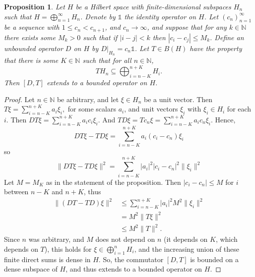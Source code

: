 \documentclass[12pt]{amsart}
\newcommand{\sse}{\subseteq}
\newcommand{\N}{\mathbb{N}}
\theoremstyle{plain} %
\newtheorem{Proposition}[Theorem]{Proposition}
\theoremstyle{definition} %
\begin{document}
\begin{Proposition}\label{prop the point of D}
    Let $H$ be a Hilbert space with finite-dimensional subspaces $H_n$ such that $H = \bigoplus_{n=1}^{\infty} H_n$. Denote by $\mathds{1}$ the identity operator on $H$.
    Let $(c_n)_{n=1}^{\infty}$ be a sequence with $1 \leq c_n < c_{n+1}$, and $c_n \to \infty$, and suppose that for any $k \in \N$ there exists some $M_k>0$ such that if $|i-j| < k$ then $|c_i - c_j| \leq M_k$. Define an unbounded operator $D$ on $H$ by $D|_{H_n} = c_n \mathds{1}$. Let $T \in B(H)$ have the property that there is some $K \in \N$ such that for all $n \in \N$, \[TH_n \sse \bigoplus_{i = n-K}^{n+K} H_i. \]
    Then $[D,T]$ extends to a bounded operator on $H$.
\end{Proposition}
\begin{proof}
    Let $n \in \N$ be arbitrary, and let $\xi \in H_n$ be a unit vector. Then $T\xi = \sum_{i=n-K}^{n+K} a_i \xi_i,$ for some scalars $a_i$, and unit vectors $\xi_i$ with $\xi_i \in H_i$ for each $i$. Then $DT \xi = \sum_{i=n-K}^{n+K} a_i c_i \xi_i.$ And $TD\xi = T c_n \xi = \sum_{i=n-K}^{n+K} a_i c_n \xi_i$. Hence,
    \[
    DT\xi - TD \xi = \sum_{i=n-K}^{n+K} a_i (c_i - c_n) \xi_i
    \]
    so
    \[
    \|DT\xi - TD \xi\|^2 = \sum_{i=n-K}^{n+K} |a_i|^2 |c_i - c_n|^2 \|\xi_i\|^2
    \]
    Let $M = M_K$ as in the statement of the proposition. Then $|c_i - c_n| \leq M$ for $i$ between $n-K$ and $n+K$, thus
    \begin{align*}
        \|(DT - TD) \xi\|^2 &\leq \sum_{i=n-K}^{n+K} |a_i|^2 M^2 \|\xi_i\|^2\\
        &= M^2 \|T \xi\|^2\\
        &\leq M^2 \|T\|^2.
    \end{align*}
    Since $n$ was arbitrary, and $M$ does not depend on $n$ (it depends on $K$, which depends on $T$), this holds for $\xi \in \bigoplus_{i=1}^n H_i$, and the increasing union of these finite direct sums is dense in $H$. So, the commutator $[D,T]$ is bounded on a dense subspace of $H$, and thus extends to a bounded operator on $H$.
\end{proof}
\end{document}
